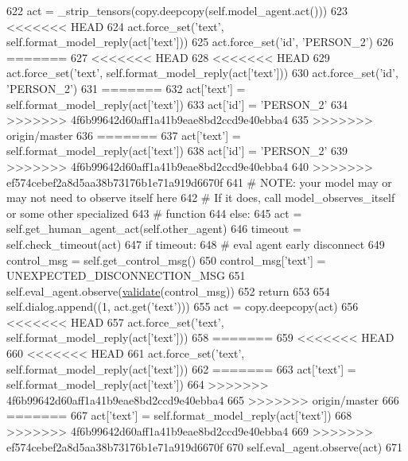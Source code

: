 \begin{DoxyCode}
622                 act = \_strip\_tensors(copy.deepcopy(self.model\_agent.act()))
623 <<<<<<< HEAD
624                 act.force\_set(\textcolor{stringliteral}{'text'}, self.format\_model\_reply(act[\textcolor{stringliteral}{'text'}]))
625                 act.force\_set(\textcolor{stringliteral}{'id'}, \textcolor{stringliteral}{'PERSON\_2'})
626 =======
627 <<<<<<< HEAD
628 <<<<<<< HEAD
629                 act.force\_set(\textcolor{stringliteral}{'text'}, self.format\_model\_reply(act[\textcolor{stringliteral}{'text'}]))
630                 act.force\_set(\textcolor{stringliteral}{'id'}, \textcolor{stringliteral}{'PERSON\_2'})
631 =======
632                 act[\textcolor{stringliteral}{'text'}] = self.format\_model\_reply(act[\textcolor{stringliteral}{'text'}])
633                 act[\textcolor{stringliteral}{'id'}] = \textcolor{stringliteral}{'PERSON\_2'}
634 >>>>>>> 4f6b99642d60aff1a41b9eae8bd2ccd9e40ebba4
635 >>>>>>> origin/master
636 =======
637                 act[\textcolor{stringliteral}{'text'}] = self.format\_model\_reply(act[\textcolor{stringliteral}{'text'}])
638                 act[\textcolor{stringliteral}{'id'}] = \textcolor{stringliteral}{'PERSON\_2'}
639 >>>>>>> 4f6b99642d60aff1a41b9eae8bd2ccd9e40ebba4
640 >>>>>>> ef574cebef2a8d5aa38b73176b1e71a919d6670f
641                 \textcolor{comment}{# NOTE: your model may or may not need to observe itself here}
642                 \textcolor{comment}{# If it does, call model\_observes\_itself or some other specialized}
643                 \textcolor{comment}{# function}
644             \textcolor{keywordflow}{else}:
645                 act = self.get\_human\_agent\_act(self.other\_agent)
646                 timeout = self.check\_timeout(act)
647                 \textcolor{keywordflow}{if} timeout:
648                     \textcolor{comment}{# eval agent early disconnect}
649                     control\_msg = self.get\_control\_msg()
650                     control\_msg[\textcolor{stringliteral}{'text'}] = UNEXPECTED\_DISCONNECTION\_MSG
651                     self.eval\_agent.observe(\hyperlink{namespaceparlai_1_1core_1_1worlds_afc3fad603b7bce41dbdc9cdc04a9c794}{validate}(control\_msg))
652                     \textcolor{keywordflow}{return}
653 
654             self.dialog.append((1, act.get(\textcolor{stringliteral}{'text'})))
655             act = copy.deepcopy(act)
656 <<<<<<< HEAD
657             act.force\_set(\textcolor{stringliteral}{'text'}, self.format\_model\_reply(act[\textcolor{stringliteral}{'text'}]))
658 =======
659 <<<<<<< HEAD
660 <<<<<<< HEAD
661             act.force\_set(\textcolor{stringliteral}{'text'}, self.format\_model\_reply(act[\textcolor{stringliteral}{'text'}]))
662 =======
663             act[\textcolor{stringliteral}{'text'}] = self.format\_model\_reply(act[\textcolor{stringliteral}{'text'}])
664 >>>>>>> 4f6b99642d60aff1a41b9eae8bd2ccd9e40ebba4
665 >>>>>>> origin/master
666 =======
667             act[\textcolor{stringliteral}{'text'}] = self.format\_model\_reply(act[\textcolor{stringliteral}{'text'}])
668 >>>>>>> 4f6b99642d60aff1a41b9eae8bd2ccd9e40ebba4
669 >>>>>>> ef574cebef2a8d5aa38b73176b1e71a919d6670f
670             self.eval\_agent.observe(act)
671 
\end{DoxyCode}
